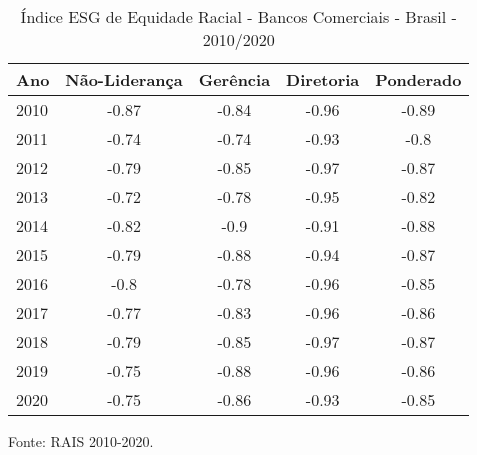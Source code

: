 \begin{table}[htb!]
\centering
\caption{Índice ESG de Equidade Racial - Bancos Comerciais - Brasil - 2010/2020}
\begin{tabular}{lcccc}
\hline
Ano  & Não-Liderança & Gerência & Diretoria & Ponderado \\ \hline
2010 & -0.87          & -0.84    & -0.96     & -0.89     \\
2011 & -0.74          & -0.74    & -0.93     & -0.8      \\
2012 & -0.79          & -0.85    & -0.97     & -0.87     \\
2013 & -0.72          & -0.78    & -0.95     & -0.82     \\
2014 & -0.82          & -0.9     & -0.91     & -0.88     \\
2015 & -0.79          & -0.88    & -0.94     & -0.87     \\
2016 & -0.8           & -0.78    & -0.96     & -0.85     \\
2017 & -0.77          & -0.83    & -0.96     & -0.86     \\
2018 & -0.79          & -0.85    & -0.97     & -0.87     \\
2019 & -0.75          & -0.88    & -0.96     & -0.86     \\
2020 & -0.75          & -0.86    & -0.93     & -0.85     \\ \hline
\end{tabular}
\begin{floatnotes}
\item [Fonte:] RAIS 2010-2020.
\end{floatnotes}
\end{table}